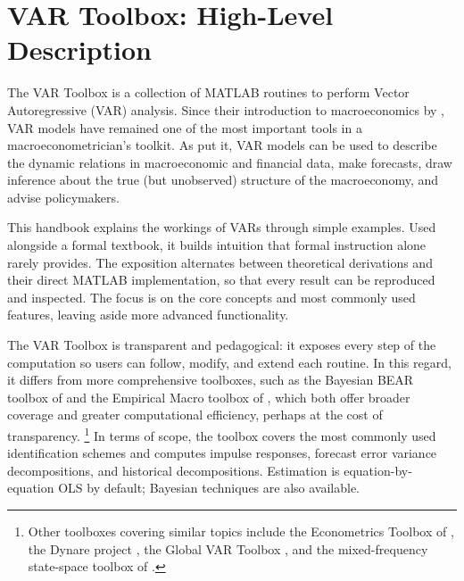 \documentclass[12pt]{article}
\makeatletter
\newcommand*\codesize{\@setfontsize\codesize{9.0}{10.5}}
\newcommand*\mcsize{\@setfontsize\mcsize{10.0}{11.5}}
\newcommand{\mc}[1]{\colorbox{script!80}{\mcsize\texttt{#1}}}
\newcommand{\mci}[1]{\colorbox{script!80}{\texttt{#1}}}
\let\oldfootnote\footnote
\renewcommand{\footnote}[1]{%
  \oldfootnote{{\renewcommand{\mc}[1]{\colorbox{script!80}{\codesize\texttt{##1}}}%
               \renewcommand{\mci}[1]{\colorbox{script!80}{\codesize\texttt{##1}}}#1}}%
}
\makeatother
\begin{document}
\newpage

\normalsize
\setlength{\parskip}{.25cm}

\section{VAR Toolbox: High-Level Description}\label{sec:intro}

The VAR Toolbox is a collection of MATLAB routines to perform Vector Autoregressive (VAR) analysis. Since their introduction to macroeconomics by \cite{Sims1980}, VAR models have remained one of the most important tools in a macroeconometrician's toolkit. As \cite{StockWatson2001} put it, VAR models can be used to describe the dynamic relations in macroeconomic and financial data, make forecasts, draw inference about the true (but unobserved) structure of the macroeconomy, and advise policymakers.

This handbook explains the workings of VARs through simple examples. Used alongside a formal textbook, it builds intuition that formal instruction alone rarely provides. The exposition alternates between theoretical derivations and their direct MATLAB implementation, so that every result can be reproduced and inspected. The focus is on the core concepts and most commonly used features, leaving aside more advanced functionality.

The VAR Toolbox is transparent and pedagogical: it exposes every step of the computation so users can follow, modify, and extend each routine. In this regard, it differs from more comprehensive toolboxes, such as the Bayesian BEAR toolbox of \cite{DieppeVanRoyeLegrand2016} and the Empirical Macro toolbox of \cite{CanovaFerroni2020}, which both offer broader coverage and greater computational efficiency, perhaps at the cost of transparency.\footnote{Other toolboxes covering similar topics include the Econometrics Toolbox of \cite{LeSage1999}, the Dynare project \citep{AdjemianEtAl2011}, the Global VAR Toolbox \citep{SmithGalesi2014}, and the mixed-frequency state-space toolbox of \cite{BraveButtersKelley2022}.} In terms of scope, the toolbox covers the most commonly used identification schemes and computes impulse responses, forecast error variance decompositions, and historical decompositions. Estimation is equation-by-equation OLS by default; Bayesian techniques are also available.
\end{document}
